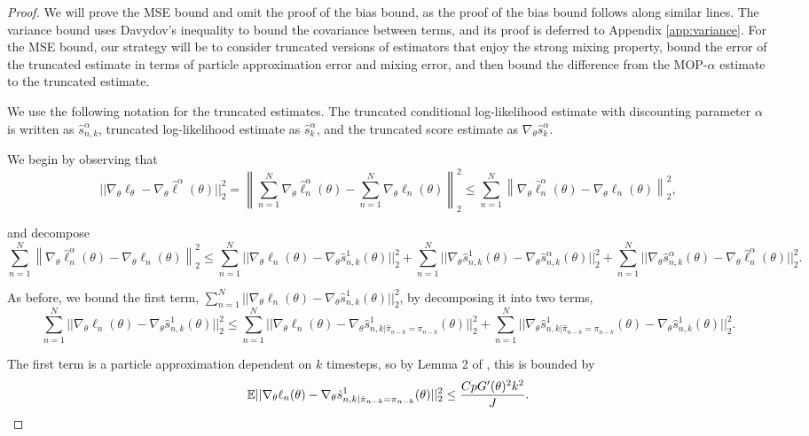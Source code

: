 \documentclass{article}
\begin{document}
\begin{proof}
We will prove the MSE bound and omit the proof of the bias bound, as the proof of the bias bound follows along similar lines. The variance bound uses Davydov's inequality to bound the covariance between terms, and its proof is deferred to Appendix \ref{app:variance}. For the MSE bound, our strategy will be to consider truncated versions of estimators that enjoy the strong mixing property, bound the error of the truncated estimate in terms of particle approximation error and mixing error, and then bound the difference from the MOP-$\alpha$ estimate to the truncated estimate.

We use the following notation for the truncated estimates. The truncated conditional log-likelihood estimate with discounting parameter $\alpha$ is written as $\hat{s}_{n,k}^{\alpha}$, truncated log-likelihood estimate as $\hat{s}_{k}^{\alpha}$, and the truncated score estimate as $\nabla_\theta \hat{s}_{k}^{\alpha}$. 

We begin by observing that 
$$||\nabla_\theta\ell_\theta - \nabla_\theta \hat\ell^\alpha(\theta)||_2^2 =  \left\lVert\sum_{n=1}^N \nabla_\theta \hat\ell_n^\alpha(\theta) - \sum_{n=1}^N \nabla_\theta \ell_n(\theta)\right\rVert_2^2 \leq \sum_{n=1}^N\left\lVert \nabla_\theta \hat\ell_n^\alpha(\theta) -  \nabla_\theta \ell_n(\theta)\right\rVert_2^2,$$

and decompose
$$\sum_{n=1}^N\left\lVert \nabla_\theta \hat\ell_n^\alpha(\theta) -  \nabla_\theta \ell_n(\theta)\right\rVert_2^2 \leq \sum_{n=1}^N||\nabla_\theta\ell_n(\theta) - \nabla_\theta\hat s_{n,k}^1(\theta)||_2^2 + \sum_{n=1}^N||\nabla_\theta\hat s_{n,k}^1(\theta) - \nabla_\theta\hat s_{n,k}^\alpha(\theta)||_2^2 + \sum_{n=1}^N||\nabla_\theta\hat s_{n,k}^\alpha(\theta) -  \nabla_\theta\hat\ell_n^\alpha(\theta)||_2^2.$$

As before, we bound the first term, $\sum_{n=1}^N||\nabla_\theta\ell_n(\theta) - \nabla_\theta\hat s_{n,k}^1(\theta)||_2^2$, by decomposing it into two terms, 
$$\sum_{n=1}^N||\nabla_\theta\ell_n(\theta) - \nabla_\theta\hat s_{n,k}^1(\theta)||_2^2 \leq \sum_{n=1}^N ||\nabla_\theta\ell_n(\theta) - \nabla_\theta\hat s_{n,k|\hat\pi_{n-k}=\pi_{n-k}}^1(\theta)||_2^2 + \sum_{n=1}^N ||\nabla_\theta\hat s_{n,k|\hat\pi_{n-k}=\pi_{n-k}}^1(\theta) - \nabla_\theta\hat s_{n,k}^1(\theta)||_2^2.$$

The first term is a particle approximation dependent on $k$ timesteps, so by Lemma 2 of \cite{karjalainen2023}, this is bounded by
$$\mathbb{E}||\nabla_\theta\ell_n(\theta) - \nabla_\theta\hat s_{n,k|\hat\pi_{n-k}=\pi_{n-k}}^1(\theta)||_2^2 \leq \frac{CpG'(\theta)^2k^2}{J}.$$


\end{proof}
\end{document}
